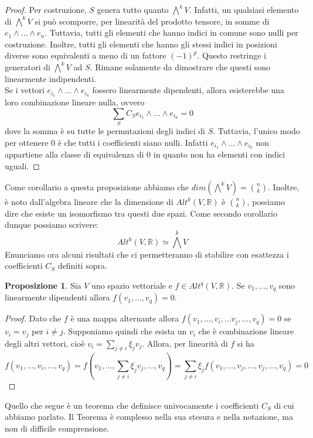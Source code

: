 \documentclass[12pt,a4paper]{report}
\theoremstyle{definition}
\theoremstyle{Theorem}
\newtheorem{Prop}[Def]{Proposizione}
\theoremstyle{definition}
\theoremstyle{definition}
\theoremstyle{definition}
\begin{document}
\begin{proof}
	Per costruzione, $S$ genera tutto quanto $\bigwedge^kV$. Infatti, un qualsiasi elemento di $\bigwedge^kV$ si può scomporre, per linearità del prodotto tensore, in somme di $e_1\wedge...\wedge e_n$. Tuttavia, tutti gli elementi che hanno indici in comune sono nulli per costruzione. Inoltre, tutti gli elementi che hanno gli stessi indici in posizioni diverse sono equivalenti a meno di un fattore $(-1)^p$. Questo restringe i generatori di $\bigwedge^kV$ ad $S$. Rimane solamente da dimostrare che questi sono linearmente indipendenti.\\
	Se i vettori $e_{i_1}\wedge...\wedge e_{i_k}$ fossero linearmente dipendenti, allora esisterebbe una loro combinazione lineare nulla, ovvero
	$$\sum_{S}C_Se_{i_1}\wedge...\wedge e_{i_k}=0$$
	dove la somma è su tutte le permutazioni degli indici di $S$. Tuttavia, l'unico modo per ottenere $0$ è che tutti i coefficienti siano nulli. Infatti $e_{i_1}\wedge...\wedge e_{i_k}$ non appartiene alla classe di equivalenza di $0$ in quanto non ha elementi con indici uguali.
	\end{proof}
Come corollario a questa proposizione abbiamo che $dim(\bigwedge^kV)={n\choose k}$.
Inoltre, è noto dall'algebra lineare che la dimensione di $Alt^k(V,\mathbb{R})$ è ${n\choose k}$, possiamo dire che esiste un isomorfismo tra questi due spazi. Come secondo corollario dunque possiamo scrivere: 
$$Alt^k(V,\mathbb{R})\simeq \bigwedge^kV$$ 
Enunciamo ora alcuni risultati che ci permetteranno di stabilire con esattezza i coefficienti $C_S$ definiti sopra.
\begin{Prop}
	Sia $V$ uno spazio vettoriale e $f\in Alt^q(V,\mathbb{R})$. Se $v_1,...,v_q$ sono linearmente dipendenti allora $f(v_1,...,v_q)=0.$
\end{Prop}
\begin{proof}
	Dato che $f$ è una mappa alternante allora $f(v_1,...,v_i,...v_j,...,v_q)=0$ se $v_i=v_j$ per $i\neq j$. Supponiamo quindi che esista un $v_i$ che è combinazione lineare degli altri vettori, cioè $v_i=\sum_{j\neq i}\xi_jv_j$. Allora, per linearità di $f$ si ha
	$$f(v_1,...,v_i,...,v_q)=f(v_1,...,\sum_{j\neq i}\xi_jv_j,...,v_q)=\sum_{j\neq i}\xi_jf(v_1,...,v_j,...,v_j,...,v_q)=0$$
\end{proof}
Quello che segue è un teorema che definisce univocamente i coefficienti $C_S$ di cui abbiamo parlato. Il Teorema è complesso nella sua stesura e nella notazione, ma non di difficile comprensione.
\end{document}
